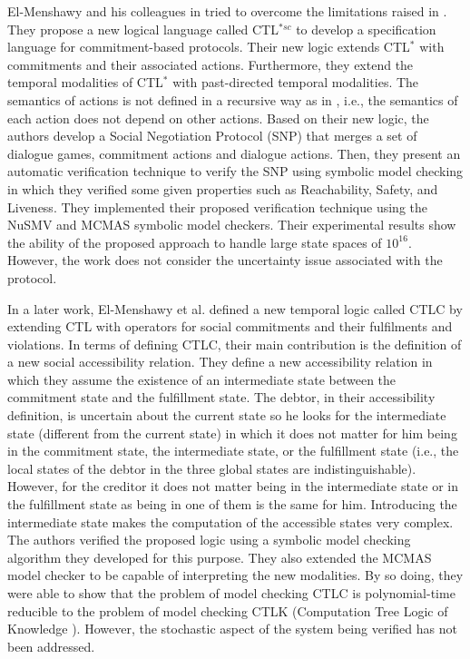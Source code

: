 El-Menshawy and his colleagues in \cite{El-Menshawy2010} tried to
overcome the limitations raised in
\cite{Bentahar2004,Bentahar2007}. They propose a new logical
language called CTL$^{*sc}$ to develop a specification language
for commitment-based protocols. Their new logic extends CTL$^*$
with commitments and their associated actions. Furthermore, they
extend the temporal modalities of CTL$^*$ with past-directed
temporal modalities. The semantics of actions is not defined in a
recursive way as in \cite{Bentahar2004,Bentahar2007}, i.e., the
semantics of each action does not depend on other actions. Based
on their new logic, the authors develop a Social Negotiation
Protocol (SNP) that merges a set of dialogue games, commitment
actions and dialogue actions. Then, they present an automatic
verification technique to verify the SNP using symbolic model
checking in which they verified some given properties such as
Reachability, Safety, and Liveness. They implemented their
proposed verification technique using the NuSMV\cite{Cimatti2002}
and MCMAS\cite{Lomuscio2006} symbolic model checkers. Their
experimental results show the ability of the proposed approach to
handle large state spaces of $10^{16}$. However, the work does not
consider the uncertainty issue associated with the protocol.

In a later work, El-Menshawy et al. \cite{El-Menshawy2011a}
defined a new temporal logic called CTLC by extending CTL with
operators for social commitments and their fulfilments and
violations. In terms of defining CTLC, their main contribution is the definition of a new social accessibility relation. They define a new
accessibility relation in which they assume the existence of an
intermediate state between the commitment state and the
fulfillment state. The debtor, in their accessibility definition,
is uncertain about the current state so he looks for the
intermediate state (different from the current state) in which it
does not matter for him being in the commitment state, the
intermediate state, or the fulfillment state (i.e., the local
states of the debtor in the three global states are
indistinguishable). However, for the creditor it does not matter
being in the intermediate state or in the fulfillment state as
being in one of them is the same for him. Introducing the intermediate state makes the computation of the accessible states very complex.
The authors verified the proposed logic using a symbolic model checking algorithm they developed for this purpose.
They also extended the MCMAS model checker to be capable of
interpreting the new modalities. By so doing, they were able to
show that the problem of model checking CTLC is polynomial-time
reducible to the problem of model checking CTLK (Computation Tree
Logic of Knowledge \cite{Penczek2003}). However, the stochastic
aspect of the system being verified has not been addressed.

